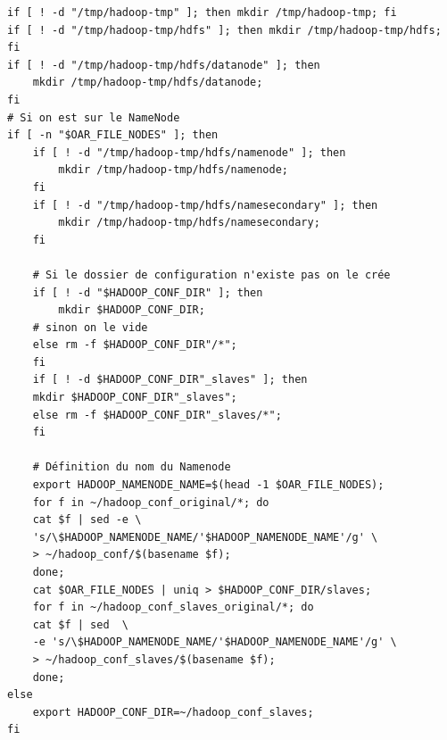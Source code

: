 \begin{verbatim}
if [ ! -d "/tmp/hadoop-tmp" ]; then mkdir /tmp/hadoop-tmp; fi
if [ ! -d "/tmp/hadoop-tmp/hdfs" ]; then mkdir /tmp/hadoop-tmp/hdfs; fi
if [ ! -d "/tmp/hadoop-tmp/hdfs/datanode" ]; then
    mkdir /tmp/hadoop-tmp/hdfs/datanode;
fi
# Si on est sur le NameNode
if [ -n "$OAR_FILE_NODES" ]; then
    if [ ! -d "/tmp/hadoop-tmp/hdfs/namenode" ]; then
        mkdir /tmp/hadoop-tmp/hdfs/namenode;
    fi
    if [ ! -d "/tmp/hadoop-tmp/hdfs/namesecondary" ]; then
        mkdir /tmp/hadoop-tmp/hdfs/namesecondary;
    fi
    
    # Si le dossier de configuration n'existe pas on le crée
    if [ ! -d "$HADOOP_CONF_DIR" ]; then 
        mkdir $HADOOP_CONF_DIR;
    # sinon on le vide
    else rm -f $HADOOP_CONF_DIR"/*";
    fi
    if [ ! -d $HADOOP_CONF_DIR"_slaves" ]; then
	mkdir $HADOOP_CONF_DIR"_slaves";
    else rm -f $HADOOP_CONF_DIR"_slaves/*";
    fi

    # Définition du nom du Namenode
    export HADOOP_NAMENODE_NAME=$(head -1 $OAR_FILE_NODES);
    for f in ~/hadoop_conf_original/*; do
	cat $f | sed -e \ 
	's/\$HADOOP_NAMENODE_NAME/'$HADOOP_NAMENODE_NAME'/g' \ 
	> ~/hadoop_conf/$(basename $f);
    done;
    cat $OAR_FILE_NODES | uniq > $HADOOP_CONF_DIR/slaves;
    for f in ~/hadoop_conf_slaves_original/*; do
	cat $f | sed  \ 
	-e 's/\$HADOOP_NAMENODE_NAME/'$HADOOP_NAMENODE_NAME'/g' \ 
	> ~/hadoop_conf_slaves/$(basename $f);
    done;
else
    export HADOOP_CONF_DIR=~/hadoop_conf_slaves;
fi
\end{verbatim}


